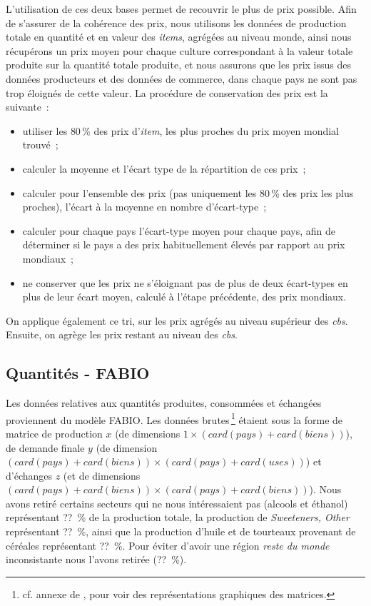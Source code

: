 L'utilisation de ces deux bases permet de recouvrir le plus de prix possible. Afin de s'assurer de la cohérence des prix, nous utilisons les données de production totale en quantité et en valeur des \textit{items}, agrégées au niveau monde, ainsi nous récupérons un prix moyen pour chaque culture correspondant à la valeur totale produite sur la quantité totale produite, et nous assurons que les prix issus des données producteurs et des données de commerce, dans chaque pays ne sont pas trop éloignés de cette valeur. La procédure de conservation des prix est la suivante~:
\begin{itemize}
    \item utiliser les {80\,\%} des prix d'\textit{item}, les plus proches du prix moyen mondial trouvé~;
    \item calculer la moyenne et l'écart type de la répartition de ces prix~;
    \item calculer pour l'ensemble des prix (pas uniquement les 80\,\% des prix les plus proches), l'écart à la moyenne en nombre d’écart-type~;
    \item calculer pour chaque pays l'écart-type moyen pour chaque pays, afin de déterminer si le pays a des prix habituellement élevés par rapport au prix mondiaux~;
    \item ne conserver que les prix ne s'éloignant pas de plus de deux écart-types en plus de leur écart moyen, calculé à l'étape précédente, des prix mondiaux.
\end{itemize}
On applique également ce tri, sur les prix agrégés au niveau supérieur des \textit{cbs}. Ensuite, on agrège les prix restant au niveau des \textit{cbs}.



\subsection{Quantités - FABIO}

Les données relatives aux quantités produites, consommées et échangées proviennent du modèle FABIO. Les données brutes\,\footnote{cf. annexe de \cite{Bruckner2019}, pour voir des représentations graphiques des matrices.} étaient sous la forme de matrice de production $x$ (de dimensions $1 \times (card(pays)+card(biens))$), de demande finale $y$ (de dimension $(card(pays)+card(biens)) \times (card(pays)+card(uses))$) et d'échanges $z$ (et de dimensions $(card(pays)+card(biens)) \times (card(pays)+card(biens))$). Nous avons retiré certains secteurs qui ne nous intéressaient pas (alcools et éthanol) représentant ??~\% de la production totale, la production de \textit{Sweeteners, Other} représentant ??~\%, ainsi que la production d'huile et de tourteaux provenant de céréales représentant ??~\%. Pour éviter d'avoir une région \textit{reste du monde} inconsistante nous l'avons retirée (??~\%).

